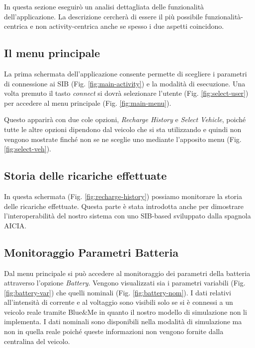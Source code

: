 In questa sezione eseguirò un analisi dettagliata delle funzionalità dell'applicazione. La descrizione cercherà di essere il più possibile funzionalità-centrica e non activity-centrica anche se spesso i due aspetti coincidono. 

\subsection{Il menu principale}

La prima schermata dell'applicazione consente permette di scegliere i parametri di connessione ai SIB (Fig. \ref{fig:main-activity}) e la modalità di esecuzione. Una volta premuto il tasto \emph{connect} si dovrà selezionare l'utente (Fig. \ref{fig:select-user}) per accedere al menu principale (Fig. \ref{fig:main-menu}).

Questo apparirà con due cole opzioni, \emph{Recharge History} e \emph{Select Vehicle}, poiché tutte le altre opzioni dipendono dal veicolo che si sta utilizzando e quindi non vengono mostrate finché non se ne sceglie uno mediante l'apposito menu (Fig. \ref{fig:select-veh}). 

\subsection{Storia delle ricariche effettuate}

In questa schermata (Fig. \ref{fig:recharge-history}) possiamo monitorare la storia delle ricariche effettuate. Questa parte è stata introdotta anche per dimostrare l'interoperabilità del nostro sistema con uno SIB-based sviluppato dalla spagnola AICIA.

\subsection{Monitoraggio Parametri Batteria}

Dal menu principale si può accedere al monitoraggio dei parametri della batteria attraverso l'opzione \emph{Battery}. Vengono visualizzati sia i parametri variabili (Fig. \ref{fig:battery-var}) che quelli nominali (Fig. \ref{fig:battery-nom}). I dati relativi all'intensità di corrente e al voltaggio sono visibili solo se si è connessi a un veicolo reale tramite Blue\&{}Me in quanto il nostro modello di simulazione non li implementa. I dati nominali sono disponibili nella modalità di simulazione ma non in quella reale poiché queste informazioni non vengono fornite dalla centralina del veicolo.

